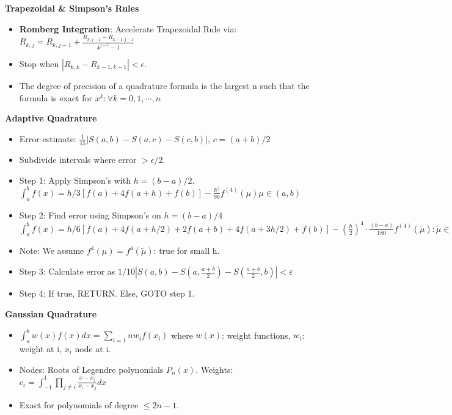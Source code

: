 \documentclass{article}
\begin{document}
\begin{minipage}[t]{0.49\textwidth}
\textbf{Trapezoidal \& Simpson's Rules}
\begin{itemize}
    \item \textbf{Romberg Integration}: Accelerate Trapezoidal Rule via:
        $R_{k,j} = R_{k,j-1} + \frac{R_{k,j-1}-R_{k-1,j-1}}{4^{j-1}-1}$
    \item Stop when $|R_{k,k}-R_{k-1,k-1}| < \epsilon$.
    \item The degree of precision of a quadrature formula is the largest n such that the formula is exact for $x^k: \forall k=0,1,\cdots,n$
\end{itemize}

\textbf{Adaptive Quadrature}
\begin{itemize}
    \item Error estimate: \( \frac{1}{15}|S(a,b)-S(a,c)-S(c,b)| \), \( c=(a+b)/2 \)
    \item Subdivide intervals where error \( > \epsilon/2 \).
    \item Step 1: Apply Simpson's with $h=(b-a)/2$. \\$\int_a^bf(x) = h/3\left[f(a)+4f(a+h)+f(b)\right]-\frac{h^5}{90}f^{(4)}(\mu) \mu\in(a,b)$
    \item Step 2: Find error using Simpson's on $h=(b-a)/4$\\
    $\int_a^bf(x)=h/6[f(a)+4f(a+h/2)+2f(a+b)+4f(a+3h/2)+f(b)]-(\frac{h}{2})^4\cdot \frac{(b-a)}{180}f^{(4)}(\tilde{\mu}): \tilde{\mu}\in(a,b)$
    \item Note: We assume $f^4(\mu)=f^4(\tilde{\mu})$: true for small h.
    \item Step 3: Calculate error as $1/10\left| S(a,b)-S(a,\frac{a+b}{2})-S(\frac{a+b}{2},b)\right| < \varepsilon $
    \item Step 4: If true, RETURN. Else, GOTO step 1.
\end{itemize}

\textbf{Gaussian Quadrature}
\begin{itemize}
  \item $\int_a^b w(x)f(x)dx=\sum_{i=1}{n}w_if(x_i)$ where $w(x)$: weight functions, $w_i$: weight at i, $x_i$ node at i. 
    \item Nodes: Roots of Legendre polynomials \( P_n(x) \). Weights: \( c_i = \int_{-1}^1 \prod_{j\neq i}\frac{x-x_j}{x_i-x_j}dx \)
    \item Exact for polynomials of degree \( \leq 2n-1 \).


\end{itemize}
\end{minipage}
\end{document}
